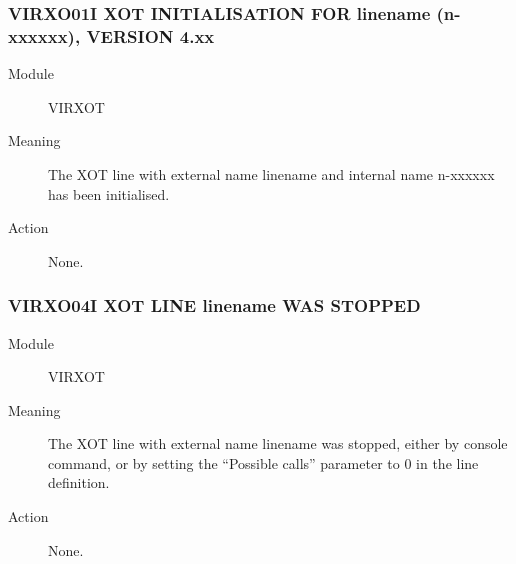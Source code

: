\documentclass[letterpaper,10pt,english]{sphinxmanual}
\begin{document}
\subsubsection{VIRXO01I XOT INITIALISATION FOR linename (n-xxxxxx), VERSION 4.xx}
\label{\detokenize{messages:virxo01i-xot-initialisation-for-linename-n-xxxxxx-version-4-xx}}\begin{description}
\item[{Module}] \leavevmode
VIRXOT

\item[{Meaning}] \leavevmode
The XOT line with external name linename and internal name n-xxxxxx has been initialised.

\item[{Action}] \leavevmode
None.

\end{description}


\subsubsection{VIRXO04I XOT LINE linename WAS STOPPED}
\label{\detokenize{messages:virxo04i-xot-line-linename-was-stopped}}\begin{description}
\item[{Module}] \leavevmode
VIRXOT

\item[{Meaning}] \leavevmode
The XOT line with external name linename was stopped, either by console command, or by setting the “Possible calls” parameter to 0 in the line definition.

\item[{Action}] \leavevmode
None.

\end{description}
\end{document}
